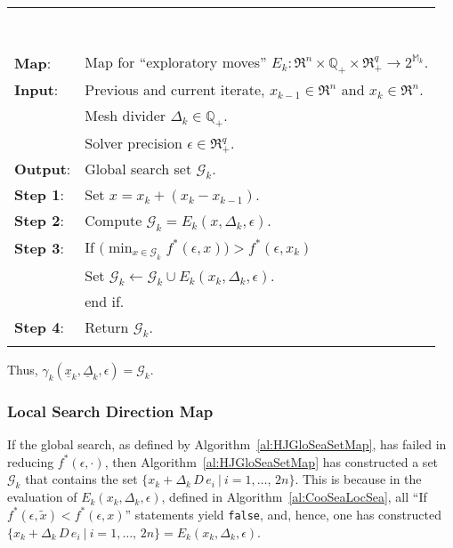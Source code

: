 \noindent
\begin{minipage}{\textwidth}
\begin{algorithm}
~\\
{\em
\begin{tabular}{ll}
\multicolumn{2}{l}{\hspace{\textwidth}~} \\ \\[-8ex]\\
\hline \\[-2ex]
\textbf{Map}:
    & Map for ``exploratory moves'' 
    $E_k \colon \Re^n \times \mathbb Q_+ \times \Re_+^q \to 2^{\mathbb M_k}$.\\
\textbf{Input}: 
    & Previous and current iterate, $x_{k-1} \in \Re^n$ 
      and $x_k \in \Re^n$.\\
    & Mesh divider $\Delta_k \in \mathbb Q_+$.\\
    & Solver precision $\epsilon \in \Re_+^q$.\\
\textbf{Output}:
    & Global search set $\mathcal G_k$.\\
\textbf{Step 1}:
    & Set $x = x_k + (x_k - x_{k-1})$.\\
\textbf{Step 2}:
    & Compute $\mathcal G_k = E_k(x, \Delta_k, \epsilon)$.\\
\textbf{Step 3}:
    & If $\bigl(\min_{x \in \mathcal G_k} 
         f^*(\epsilon,x)\bigr) > f^*(\epsilon,x_k)$\\
    & \hspace{1cm} Set $\mathcal G_k \leftarrow \mathcal G_k \cup 
                       E_k(x_k, \Delta_k, \epsilon)$.\\
    & end if.\\
\textbf{Step 4}:
    & Return $\mathcal G_k$.\\
    \hline \\
\end{tabular}
}
\end{algorithm}
\end{minipage}
Thus, $\gamma_k(\underline x_k, \underline \Delta_k, \epsilon) = \mathcal G_k$.\\

\subsubsection{Local Search Direction Map}
If the global search, as defined by 
Algorithm~\ref{al:HJGloSeaSetMap}, has failed in reducing
$f^*(\epsilon,\cdot)$, then Algorithm~\ref{al:HJGloSeaSetMap} has
constructed a set $\mathcal G_k$ that contains the set 
$\{ x_k + \Delta_k \, D \, e_i \ | \ i = 1, \ldots , \, 2 n \}$.
This is because in the evaluation of
$E_k(x_k, \Delta_k, \epsilon)$, defined in Algorithm~\ref{al:CooSeaLocSea}, all 
``If $f^*(\epsilon,\widetilde x) < f^*(\epsilon,x)$'' statements yield
{\tt false}, and, hence, one has constructed 
$\{ x_k + \Delta_k \, D \, e_i \ | \ i = 1, \ldots , \, 2 n
\} = E_k(x_k, \Delta_k, \epsilon)$.

